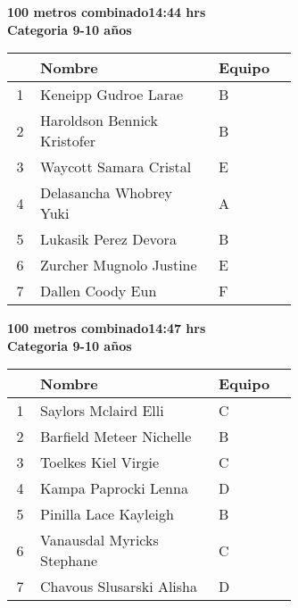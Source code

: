 \begin{minipage}{0.95\linewidth}\vspace{0.5cm} 
\begin{flushleft}
\textbf{
\hspace{-0.15cm}100 metros combinado\hspace{1.5cm}14:44 hrs \\Categoria 9-10 años}\vspace{-0.2cm} 
\end{flushleft}
\begin{tabular}{cp{0.63\linewidth}l}
\hline
& \textbf{Nombre} & \textbf{Equipo} \\ \hline
1 & Keneipp Gudroe Larae & B \\ 
2 & Haroldson Bennick Kristofer & B \\ 
3 & Waycott Samara Cristal & E \\ 
4 & Delasancha Whobrey Yuki & A \\ 
5 & Lukasik Perez Devora & B \\ 
6 & Zurcher Mugnolo Justine & E \\ 
7 & Dallen Coody Eun & F \\ 
\end{tabular}
\end{minipage}
\begin{minipage}{0.95\linewidth}\vspace{0.5cm} 
\begin{flushleft}
\textbf{
\hspace{-0.15cm}100 metros combinado\hspace{1.5cm}14:47 hrs \\Categoria 9-10 años}\vspace{-0.2cm} 
\end{flushleft}
\begin{tabular}{cp{0.63\linewidth}l}
\hline
& \textbf{Nombre} & \textbf{Equipo} \\ \hline
1 & Saylors Mclaird Elli & C \\ 
2 & Barfield Meteer Nichelle & B \\ 
3 & Toelkes Kiel Virgie & C \\ 
4 & Kampa Paprocki Lenna & D \\ 
5 & Pinilla Lace Kayleigh & B \\ 
6 & Vanausdal Myricks Stephane & C \\ 
7 & Chavous Slusarski Alisha & D \\ 
\end{tabular}
\end{minipage}
